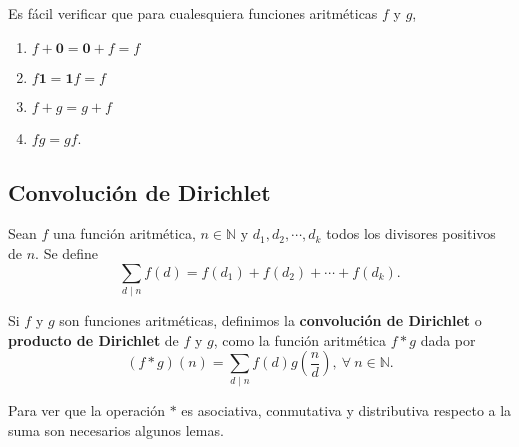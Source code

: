 Es fácil verificar que para cualesquiera funciones aritméticas $f$ y $g$,
\begin{enumerate}[label=\textnormal{(\roman*)}]
\item $f+\mathbf{0}=\mathbf{0}+f=f$ 
\item $f\mathbf{1}=\mathbf{1}f=f$ 
\item $f+g=g+f$
\item $fg=gf$.
\end{enumerate}

\subsection{Convolución de Dirichlet}

\begin{definition}
Sean $f$ una función aritmética, $n\in\mathbb{N}$ y $d_1,d_2,\cdots,d_k$ todos los divisores positivos de $n$. Se define 
\begin{equation*}
	\sum_{d \mid n} f(d)=f(d_1)+f(d_2)+\cdots+f(d_k).
\end{equation*}
\end{definition}

\begin{definition}
Si $f$ y $g$ son funciones aritméticas, definimos la \textbf{convolución de Dirichlet} o \textbf{producto de Dirichlet} de $f$ y $g$, como la función aritmética $f*g$ dada por 
\begin{equation*}
	(f*g)(n)=\sum_{d \mid n} f(d)g\left(\frac{n}{d}\right),\:\forall \: n\in\mathbb{N}.
\end{equation*}
\end{definition}

Para ver que la operación $*$ es asociativa, conmutativa y distributiva respecto a la suma son necesarios algunos lemas.

